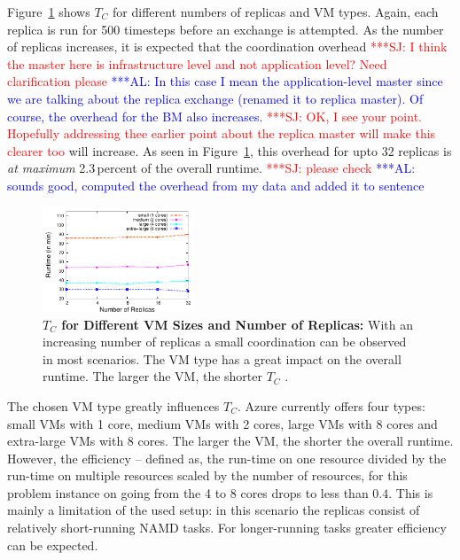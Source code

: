 \documentclass[conference,final]{IEEEtran}
\newcommand{\up}{\vspace*{-1em}}
\newcommand{\tc}{$T_{C}$ }
\newcommand{\tcnsp}{$T_{C}$}
\newcommand{\alnote}[1]{ {\textcolor{blue} { ***AL: #1 }}}
\newcommand{\jhanote}[1]{ {\textcolor{red} { ***SJ: #1 }}}
\newcommand{\alnote}[1]{}
\newcommand{\jhanote}[1]{}
\begin{document}
Figure~\ref{fig:performance_repex_scaleout_vmsizes} shows \tc for
different numbers of replicas and VM types.  Again, each replica is
run for 500 timesteps before an exchange is attempted. As the number
of replicas increases, it is expected that the coordination overhead
\jhanote{I think the master here is
  infrastructure level and not application level? Need clarification
  please} \alnote{In this case I mean the application-level master
  since we are talking about the replica exchange (renamed it to
  replica master).  Of course, the overhead for the BM also
  increases.}\jhanote{OK, I see your point. Hopefully addressing thee
  earlier point about the replica master will make this clearer too}
will increase. As seen in
Figure~\ref{fig:performance_repex_scaleout_vmsizes}, this overhead for
upto 32 replicas is {\it at maximum} 2.3\,percent of the overall
runtime. \jhanote{please check} \alnote{sounds good, computed the
  overhead from my data and added it to sentence}
\begin{figure}[ht]
    \centering
        \includegraphics[width=0.4\textwidth]{performance/repex-azure.pdf}
        \caption{\textbf{\tc for Different VM Sizes and Number of
            Replicas:} With an increasing number of replicas a small
          coordination can be observed in most scenarios. The VM type
          has a great impact on the overall runtime. The larger the
          VM, the shorter \tc. }
    \label{fig:performance_repex_scaleout_vmsizes}
    \up
\end{figure}

The chosen VM type greatly influences \tcnsp. Azure currently offers
four types: small VMs with 1 core, medium VMs with 2 cores, large VMs
with 8 cores and extra-large VMs with 8 cores. The larger the VM, the
shorter the overall runtime.  However, the efficiency -- defined as,
the run-time on one resource divided by the run-time on multiple
resources scaled by the number of resources, for this problem instance
on going from the 4 to 8 cores drops to less than $0.4$. This is
mainly a limitation of the used setup: in this scenario the replicas
consist of relatively short-running NAMD tasks.  For longer-running
tasks greater efficiency can be
expected.  %
\end{document}
